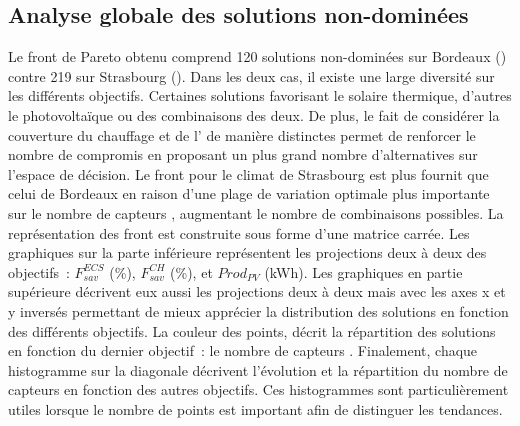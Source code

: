 \subsection{Analyse globale des solutions non-dominées} %
\label{sub:analyse_globale_des_solutions_non_dominees}
Le front de Pareto obtenu comprend \num{120} solutions non-dominées sur Bordeaux
() contre \num{219} sur Strasbourg
(). Dans les deux cas, il existe une large diversité
sur les différents objectifs. Certaines solutions favorisant le solaire thermique,
d’autres le photovoltaïque ou des combinaisons des deux. De plus, le fait de considérer
la couverture du chauffage et de l’ de manière distinctes permet de renforcer le
nombre de compromis en proposant un plus grand nombre d’alternatives sur l’espace de décision.
Le front pour le climat de Strasbourg est plus fournit que celui de Bordeaux en raison d’une plage de variation
optimale plus importante sur le nombre de capteurs , augmentant le nombre de
combinaisons possibles.
La représentation des front est construite sous forme d’une matrice carrée.
Les graphiques sur la parte inférieure représentent les projections deux à deux des objectifs~:
$F_{sav}^{ECS}$ (\si{\percent}), $F_{sav}^{CH}$ (\si{\percent}), et $Prod_{PV}$ (\si{kWh}).
Les graphiques en partie supérieure décrivent eux aussi les projections deux à deux mais
avec les axes x et y inversés permettant de mieux
apprécier la distribution des solutions en fonction des différents objectifs. La couleur des points,
décrit la répartition des solutions en fonction du dernier objectif~: le nombre de capteurs .
Finalement, chaque histogramme sur la diagonale décrivent l’évolution et la répartition du
nombre de capteurs  en fonction des autres objectifs. Ces histogrammes sont
particulièrement utiles lorsque le nombre de points est important afin de distinguer
les tendances.

